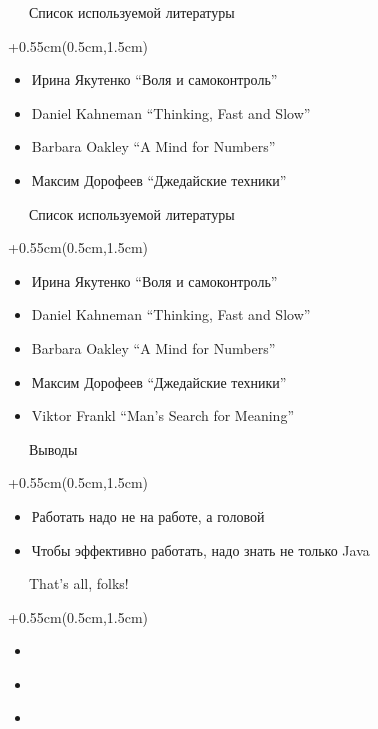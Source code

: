 \documentclass[xetex,18pt,aspectratio=169]{beamer}
\begin{document}
\begin{Large}
\begin{frame}{\ \ \ Список используемой литературы}
\begin{textblock*}{\framewidth+0.55cm}(0.5cm,1.5cm)
\begin{itemize}
  \item Ирина Якутенко ``Воля и самоконтроль''
  \item Daniel Kahneman ``Thinking, Fast and Slow''
  \item Barbara Oakley ``A Mind for Numbers''
  \item Максим Дорофеев ``Джедайские техники''
\end{itemize}
\end{textblock*}
\end{frame}

\begin{frame}{\ \ \ Список используемой литературы}
\begin{textblock*}{\framewidth+0.55cm}(0.5cm,1.5cm)
\begin{itemize}
  \item Ирина Якутенко ``Воля и самоконтроль''
  \item Daniel Kahneman ``Thinking, Fast and Slow''
  \item Barbara Oakley ``A Mind for Numbers''
  \item Максим Дорофеев ``Джедайские техники''
  \item Viktor Frankl ``Man's Search for Meaning''
\end{itemize}
\end{textblock*}
\end{frame}

\begin{frame}{\ \ \ Выводы}
\begin{textblock*}{\framewidth+0.55cm}(0.5cm,1.5cm)
\begin{itemize}
  \item Работать надо не на работе, а головой
  \item Чтобы эффективно работать, надо знать не только Java
\end{itemize}
\end{textblock*}
\end{frame}

\begin{frame}{\ \ \ That's all, folks!}
\begin{textblock*}{\framewidth+0.55cm}(0.5cm,1.5cm)
\begin{itemize}
  \item \href{mailto:alexclear@gmail.com}{\color{linkcolor}{alexclear@gmail.com}}
  \item \href{https://telegram.me/lhommequipleure}{\color{linkcolor}{https://telegram.me/lhommequipleure}}
  \item \href{https://telegram.me/demeliorator\_pod}{\color{linkcolor}{https://telegram.me/demeliorator\_pod}}
\end{itemize}
\end{textblock*}
\end{frame}

\end{Large}
\end{document}
